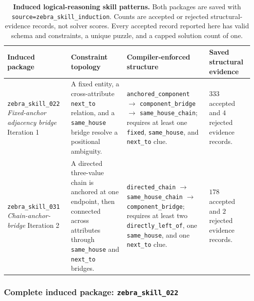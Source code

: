 \begin{table}[htbp]
    \centering
    \small
    \renewcommand{\arraystretch}{1.22}
    \setlength{\tabcolsep}{3.5pt}
    \begin{tabular*}{\textwidth}{@{\extracolsep{\fill}} >{\raggedright\arraybackslash}p{} >{\raggedright\arraybackslash}p{} >{\raggedright\arraybackslash}p{} >{\raggedright\arraybackslash}p{}}
        \toprule
        \textbf{Induced package} & \textbf{Constraint topology} & \textbf{Compiler-enforced structure} & \textbf{Saved structural evidence} \\
        \midrule
        \texttt{zebra\_skill\_022}\newline
        \emph{Fixed-anchor adjacency bridge}\newline
        Iteration 1
        & A fixed entity, a cross-attribute \texttt{next\_to} relation, and a \texttt{same\_house} bridge resolve a positional ambiguity.
        & \texttt{anchored\_component} $\rightarrow$ \texttt{component\_bridge} $\rightarrow$ \texttt{same\_house\_chain}; requires at least one \texttt{fixed}, \texttt{same\_house}, and \texttt{next\_to} clue.
        & $333$ accepted and $4$ rejected evidence records. \\
        \addlinespace[0.45em]
        \texttt{zebra\_skill\_031}\newline
        \emph{Chain-anchor-bridge}\newline
        Iteration 2
        & A directed three-value chain is anchored at one endpoint, then connected across attributes through \texttt{same\_house} and \texttt{next\_to} bridges.
        & \texttt{directed\_chain} $\rightarrow$ \texttt{same\_house\_chain} $\rightarrow$ \texttt{component\_bridge}; requires at least two \texttt{directly\_left\_of}, one \texttt{same\_house}, and one \texttt{next\_to} clue.
        & $178$ accepted and $2$ rejected evidence records. \\
        \bottomrule
    \end{tabular*}
    \caption{\textbf{Induced logical-reasoning skill patterns.} Both packages are saved with \texttt{source=zebra\_skill\_induction}. Counts are accepted or rejected structural-evidence records, not solver scores. Every accepted record reported here has valid schema and constraints, a unique puzzle, and a capped solution count of one.}
    \label{tab:logical_skill_cases}
\end{table}

\subsubsection{Complete induced package: \texttt{zebra\_skill\_022}}
\label{app:complete_logical_skill_anchor}

